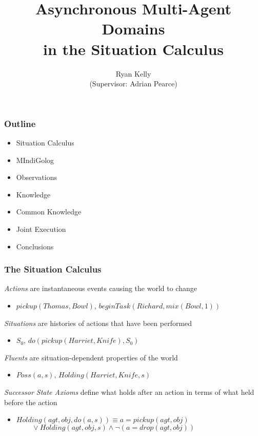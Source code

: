 \documentclass{beamer}
\title{Asynchronous Multi-Agent Domains\\ in the Situation Calculus}
\author{Ryan Kelly\\ (Supervisor: Adrian Pearce)}
\begin{document}
\begin{frame}
  \titlepage
\end{frame}

\begin{frame}
  \frametitle{Outline}
  \begin{itemize}
  \item Situation Calculus
  \item MIndiGolog
  \item Observations
  \item Knowledge
  \item Common Knowledge
  \item Joint Execution
  \item Conclusions
  \end{itemize}
\end{frame}

\begin{frame}
\frametitle{The Situation Calculus}
\emph{Actions} are instantaneous events causing the world to change
\begin{itemize}
  \item $pickup(Thomas,Bowl)$, $beginTask(Richard,mix(Bowl,1))$
\end{itemize}
\emph{Situations} are histories of actions that have been performed
\begin{itemize}
  \item $S_0$, $do(pickup(Harriet,Knife),S_0)$
\end{itemize}
\emph{Fluents} are situation-dependent properties of the world
\begin{itemize}
  \item $Poss(a,s)$, $Holding(Harriet,Knife,s)$
\end{itemize}
\emph{Successor State Axioms} define what holds after an action in terms of what held before the action
\begin{itemize}
  \item $Holding(agt,obj,do(a,s)) \equiv a = pickup(agt,obj)$ \\
        $\,\,\,\,\,\,\,\,\,\,\,\,\,\vee Holding(agt,obj,s) \wedge \neg\left(a = drop(agt,obj)\right)$
\end{itemize}
\end{frame}
\end{document}
